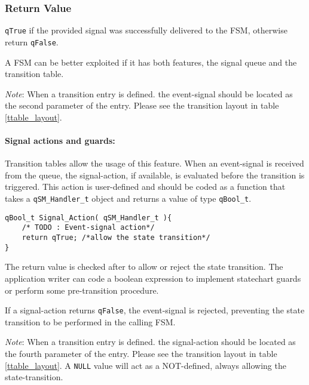 \subsubsection*{Return Value}
\lstinline{qTrue} if the provided signal was successfully delivered to the FSM, otherwise return \lstinline{qFalse}.

\hrulefill
\medskip

\begin{tcolorbox}
\HandRight A FSM can be better exploited if it has both features, the signal queue and the transition table.
\end{tcolorbox}

\begin{tcolorbox}
\ArrowBoldDownRight \textit{Note}: When a transition entry is defined. the event-signal should be located as the second parameter of the entry. Please see the transition layout in table \ref{ttable_layout}.
\end{tcolorbox}

\paragraph{Signal actions and guards:} Transition tables allow the usage of this feature. When an event-signal is received from the queue, the signal-action, if available, is evaluated before the transition is triggered. This action is user-defined and should be coded as a function that takes a \lstinline{qSM_Handler_t} object and returns a value of type \lstinline{qBool_t}. 
\medskip

\begin{lstlisting}[style=CStyle]
qBool_t Signal_Action( qSM_Handler_t ){
    /* TODO : Event-signal action*/
    return qTrue; /*allow the state transition*/
}
\end{lstlisting}

The return value is checked after to allow or reject the state transition. The application writer can code a boolean expression to implement statechart guards or perform some pre-transition procedure.

\begin{tcolorbox}
\HandRight If a signal-action returns \lstinline{qFalse}, the event-signal is rejected, preventing the state transition to be performed in the calling FSM.
\end{tcolorbox}

\begin{tcolorbox}
\ArrowBoldDownRight \textit{Note}: When a transition entry is defined. the signal-action should be located as the fourth parameter of the entry. Please see the transition layout in table \ref{ttable_layout}.
A \lstinline{NULL} value will act as a NOT-defined, always allowing the state-transition. 
\end{tcolorbox}

